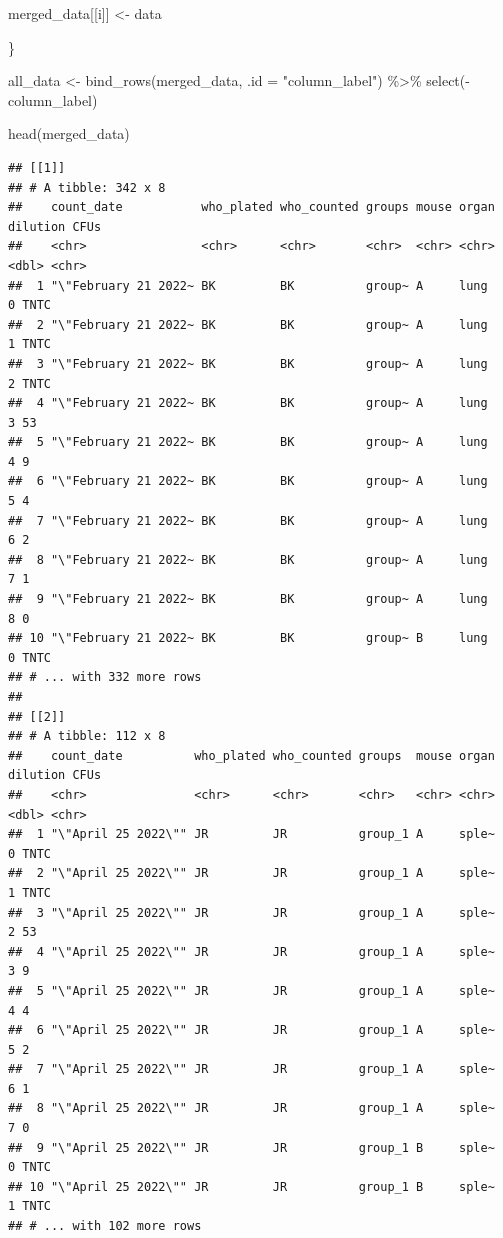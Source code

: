 \documentclass[
]{book}
\newenvironment{Shaded}{\begin{snugshade}}{\end{snugshade}}
\newcommand{\AttributeTok}[1]{\textcolor[rgb]{0.77,0.63,0.00}{#1}}
\newcommand{\FunctionTok}[1]{\textcolor[rgb]{0.00,0.00,0.00}{#1}}
\newcommand{\NormalTok}[1]{#1}
\newcommand{\OtherTok}[1]{\textcolor[rgb]{0.56,0.35,0.01}{#1}}
\newcommand{\SpecialCharTok}[1]{\textcolor[rgb]{0.00,0.00,0.00}{#1}}
\newcommand{\StringTok}[1]{\textcolor[rgb]{0.31,0.60,0.02}{#1}}
\begin{document}
\begin{Shaded}
\begin{Highlighting}[]
  
\NormalTok{  merged\_data[[i]] }\OtherTok{\textless{}{-}}\NormalTok{ data}
  
  
\NormalTok{\}}
  
\NormalTok{all\_data }\OtherTok{\textless{}{-}} \FunctionTok{bind\_rows}\NormalTok{(merged\_data, }\AttributeTok{.id =} \StringTok{"column\_label"}\NormalTok{) }\SpecialCharTok{\%\textgreater{}\%} 
    \FunctionTok{select}\NormalTok{(}\SpecialCharTok{{-}}\NormalTok{column\_label)}
  
\FunctionTok{head}\NormalTok{(merged\_data)}
\end{Highlighting}
\end{Shaded}

\begin{verbatim}
## [[1]]
## # A tibble: 342 x 8
##    count_date           who_plated who_counted groups mouse organ dilution CFUs 
##    <chr>                <chr>      <chr>       <chr>  <chr> <chr>    <dbl> <chr>
##  1 "\"February 21 2022~ BK         BK          group~ A     lung         0 TNTC 
##  2 "\"February 21 2022~ BK         BK          group~ A     lung         1 TNTC 
##  3 "\"February 21 2022~ BK         BK          group~ A     lung         2 TNTC 
##  4 "\"February 21 2022~ BK         BK          group~ A     lung         3 53   
##  5 "\"February 21 2022~ BK         BK          group~ A     lung         4 9    
##  6 "\"February 21 2022~ BK         BK          group~ A     lung         5 4    
##  7 "\"February 21 2022~ BK         BK          group~ A     lung         6 2    
##  8 "\"February 21 2022~ BK         BK          group~ A     lung         7 1    
##  9 "\"February 21 2022~ BK         BK          group~ A     lung         8 0    
## 10 "\"February 21 2022~ BK         BK          group~ B     lung         0 TNTC 
## # ... with 332 more rows
## 
## [[2]]
## # A tibble: 112 x 8
##    count_date          who_plated who_counted groups  mouse organ dilution CFUs 
##    <chr>               <chr>      <chr>       <chr>   <chr> <chr>    <dbl> <chr>
##  1 "\"April 25 2022\"" JR         JR          group_1 A     sple~        0 TNTC 
##  2 "\"April 25 2022\"" JR         JR          group_1 A     sple~        1 TNTC 
##  3 "\"April 25 2022\"" JR         JR          group_1 A     sple~        2 53   
##  4 "\"April 25 2022\"" JR         JR          group_1 A     sple~        3 9    
##  5 "\"April 25 2022\"" JR         JR          group_1 A     sple~        4 4    
##  6 "\"April 25 2022\"" JR         JR          group_1 A     sple~        5 2    
##  7 "\"April 25 2022\"" JR         JR          group_1 A     sple~        6 1    
##  8 "\"April 25 2022\"" JR         JR          group_1 A     sple~        7 0    
##  9 "\"April 25 2022\"" JR         JR          group_1 B     sple~        0 TNTC 
## 10 "\"April 25 2022\"" JR         JR          group_1 B     sple~        1 TNTC 
## # ... with 102 more rows
\end{verbatim}
\end{document}
